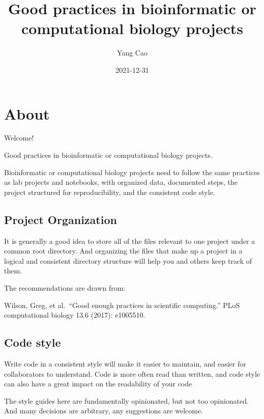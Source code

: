 \documentclass[
]{book}
\title{Good practices in bioinformatic or computational biology projects}
\author{Yang Cao}
\date{2021-12-31}
\begin{document}
\maketitle

{
\setcounter{tocdepth}{1}
\tableofcontents
}
\hypertarget{about}{%
\chapter*{About}\label{about}}

Welcome!

Good practices in bioinformatic or computational biology projects.

Bioinformatic or computational biology projects need to follow the same
practices as lab projects and notebooks, with organized data, documented steps,
the project structured for reproducibility, and the consistent code style.

\hypertarget{project-organization}{%
\section*{Project Organization}\label{project-organization}}

It is generally a good idea to store all of the files relevant to one project
under a common root directory. And organizing the files that make up a project
in a logical and consistent directory structure will help you and others keep
track of them.

The recommendations are drawn from:

Wilson, Greg, et al.~``Good enough practices in scientific computing.'' PLoS computational biology 13.6 (2017): e1005510.

\hypertarget{code-style}{%
\section*{Code style}\label{code-style}}

Write code in a consistent style will make it easier to maintain, and easier
for collaborators to understand. Code is more often read than written, and code
style can also have a great impact on the readability of your code

The style guides here are fundamentally opinionated, but not too opinionated.
And many decisions are arbitrary, any suggestions are welcome.
\end{document}
